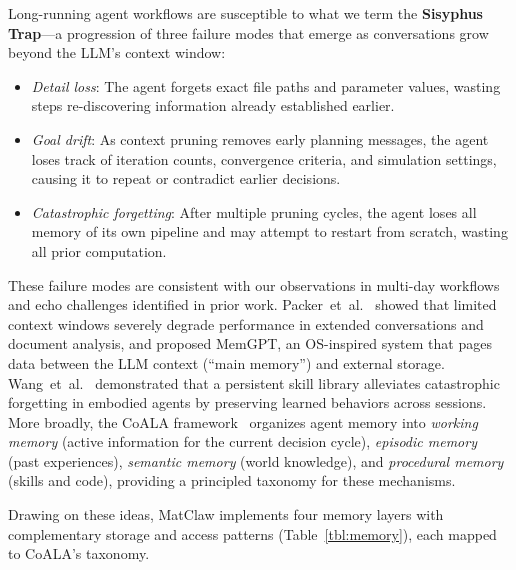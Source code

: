 \documentclass{article}
\begin{document}
Long-running agent workflows are susceptible to what we term the \textbf{Sisyphus Trap}---a progression of three failure modes that emerge as conversations grow beyond the LLM's context window:

\begin{itemize}
\item \emph{Detail loss}: The agent forgets exact file paths and parameter values, wasting steps re-discovering information already established earlier.
\item \emph{Goal drift}: As context pruning removes early planning messages, the agent loses track of iteration counts, convergence criteria, and simulation settings, causing it to repeat or contradict earlier decisions.
\item \emph{Catastrophic forgetting}: After multiple pruning cycles, the agent loses all memory of its own pipeline and may attempt to restart from scratch, wasting all prior computation.
\end{itemize}

These failure modes are consistent with our observations in multi-day workflows and echo challenges identified in prior work.
Packer~et~al.~\citep{Packer2024memgpt} showed that limited context windows severely degrade performance in extended conversations and document analysis, and proposed MemGPT, an OS-inspired system that pages data between the LLM context (``main memory'') and external storage.
Wang~et~al.~\citep{Wang2023voyager} demonstrated that a persistent skill library alleviates catastrophic forgetting in embodied agents by preserving learned behaviors across sessions.
More broadly, the CoALA framework~\citep{Sumers2024coala} organizes agent memory into \emph{working memory} (active information for the current decision cycle), \emph{episodic memory} (past experiences), \emph{semantic memory} (world knowledge), and \emph{procedural memory} (skills and code), providing a principled taxonomy for these mechanisms.

Drawing on these ideas, MatClaw implements four memory layers with complementary storage and access patterns (Table~\ref{tbl:memory}), each mapped to CoALA's taxonomy.
\end{document}
